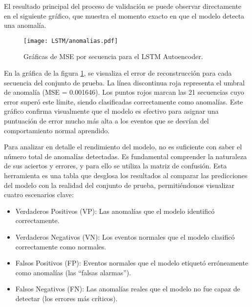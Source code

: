 El resultado principal del proceso de validación se puede observar directamente en el siguiente gráfico, que muestra el momento exacto en que el modelo detecta una anomalía.

\begin{figure}[ht!]
      \centering
      \texttt{[image: LSTM/anomalias.pdf]}
      \caption{Gráficas de MSE por secuencia para el LSTM Autoencoder.}
      \label{fig:mse_lstm}
\end{figure}

En la gráfica de la figura \ref{fig:mse_lstm}, se visualiza el error de reconstrucción para cada secuencia del conjunto de prueba. La línea discontinua roja representa el umbral de anomalía (MSE = 0.001646). Los puntos rojos marcan las 21 secuencias cuyo error superó este límite, siendo clasificadas correctamente como anomalías. Este gráfico confirma visualmente que el modelo es efectivo para asignar una puntuación de error mucho más alta a los eventos que se desvían del comportamiento normal aprendido.

Para analizar en detalle el rendimiento del modelo, no es suficiente con saber el número total de anomalías detectadas. Es fundamental comprender la naturaleza de sus aciertos y errores, y para ello se utiliza la matriz de confusión. Esta herramienta es una tabla que desglosa los resultados al comparar las predicciones del modelo con la realidad del conjunto de prueba, permitiéndonos visualizar cuatro escenarios clave:

\begin{itemize}
      \item Verdaderos Positivos (VP): Las anomalías que el modelo identificó correctamente.
      \item Verdaderos Negativos (VN): Los eventos normales que el modelo clasificó correctamente como normales.
      \item Falsos Positivos (FP): Eventos normales que el modelo etiquetó erróneamente como anomalías (las ``falsas alarmas'').
      \item Falsos Negativos (FN): Las anomalías reales que el modelo no fue capaz de detectar (los errores más críticos).
\end{itemize}

